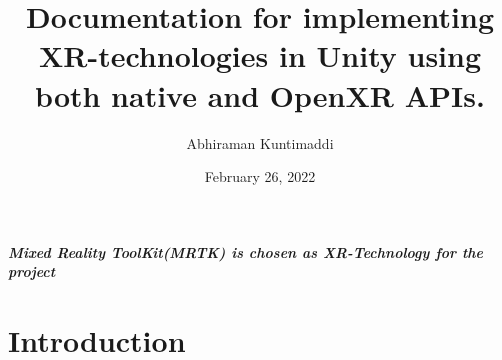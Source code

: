 \documentclass{article}
\title{\textbf{Documentation for implementing XR-technologies in Unity using both native and OpenXR APIs.}}
\author{Abhiraman Kuntimaddi}
\date{February 26, 2022}
\begin{document}
\maketitle

\begin{center}
	\textit{\textbf{Mixed Reality ToolKit(MRTK) is chosen as XR-Technology for the project}}
\end{center}


\section{Introduction}
\end{document}
